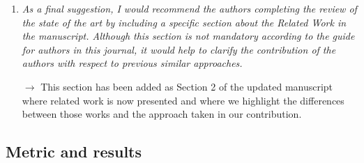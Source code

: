 \documentclass[10pt]{article}
\begin{document}
\begin{enumerate}
\item \emph{As a final suggestion, I would recommend the authors completing the review of the state of the art by including a specific section about the Related Work in the manuscript. Although this section is not mandatory according to the guide for authors in this journal, it would help to clarify the contribution of the authors with respect to previous similar approaches.}

$\rightarrow$ This section has been added as Section 2 of the updated manuscript where related work is now presented and where we highlight the differences between those works and the approach taken in our contribution.

\end{enumerate}

\subsection{Metric and results}
\end{document}
